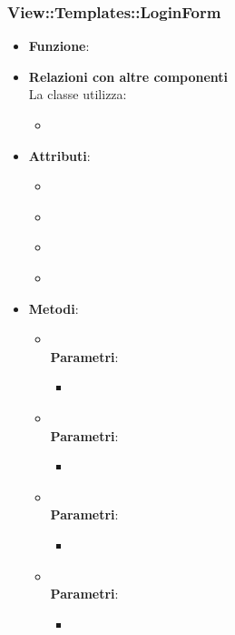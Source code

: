 \subsubsection{View::Templates::LoginForm}
\begin{itemize}
\item\textbf{Funzione}:
\item\textbf{Relazioni con altre componenti}\\
La classe utilizza:
	\begin{itemize}
		\item
	\end{itemize}
\item\textbf{Attributi}:
	\begin{itemize}
		\item\code{}\\
		\item\code{}\\
		\item\code{}\\
		\item\code{}\\
	\end{itemize}
\item\textbf{Metodi}:
	\begin{itemize}
		\item\code{}\\
		\textbf{Parametri}:
			\begin{itemize}
				\item\code{}\\
			\end{itemize}
		\item\code{}\\
		\textbf{Parametri}:
			\begin{itemize}
				\item\code{}\\
			\end{itemize}
		\item\code{}\\
		\textbf{Parametri}:
			\begin{itemize}
				\item\code{}\\
			\end{itemize}
		\item\code{}\\
		\textbf{Parametri}:
			\begin{itemize}
				\item\code{}\\
			\end{itemize}
	\end{itemize}
\end{itemize}

